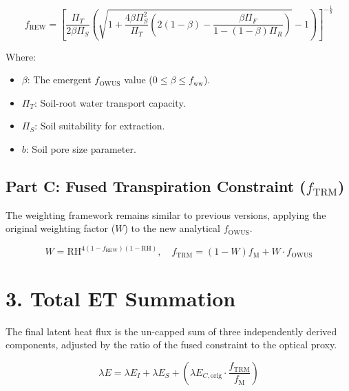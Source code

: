 \documentclass[11pt]{article}
\begin{document}
$$    f_{\mathrm{REW}} = \left[ \frac{\Pi_T}{2\beta\Pi_S} \left( \sqrt{1 + \frac{4\beta\Pi_S^2}{\Pi_T} \left( 2(1-\beta) - \frac{\beta\Pi_F}{1-(1-\beta)\Pi_R} \right)} - 1 \right) \right]^{-\frac{1}{b}}$$

Where:
\begin{itemize}
\item $\beta$: The emergent $f_{\mathrm{OWUS}}$ value ($0 \le \beta \le f_{\mathrm{ww}}$).
\item $\Pi_T$: Soil-root water transport capacity.
\item $\Pi_S$: Soil suitability for extraction.
\item $b$: Soil pore size parameter.
\end{itemize}

\subsection*{Part C: Fused Transpiration Constraint ($f_{\mathrm{TRM}}$)}

The weighting framework remains similar to previous versions, applying the original weighting factor ($W$) to the new analytical $f_{\mathrm{OWUS}}$.

$$    W = \mathrm{RH}^{4(1-f_{\mathrm{REW}})(1-\mathrm{RH})},\quad f_{\mathrm{TRM}} = (1 - W)f_{\mathrm{M}} + W \cdot f_{\mathrm{OWUS}}$$

\section*{3. Total ET Summation}

The final latent heat flux is the un-capped sum of three independently derived components, adjusted by the ratio of the fused constraint to the optical proxy.

$$    \lambda E = \lambda E_I + \lambda E_S + \left( \lambda E_{C,\mathrm{orig}} \cdot \frac{f_{\mathrm{TRM}}}{f_{\mathrm{M}}} \right)$$
\end{document}
